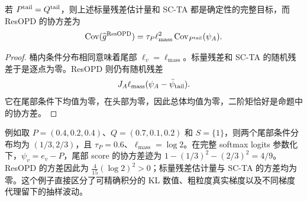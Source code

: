 \begin{proposition}
若 $P^{\mathrm{tail}}=Q^{\mathrm{tail}}$，则上述标量残差估计量和 SC-TA 都是确定性的完整目标，而 ResOPD 的协方差为
\begin{equation*}
 \operatorname{Cov}(\widehat g^{\mathrm{ResOPD}})
 =\tau_P\ell_{\mathrm{mass}}^2\operatorname{Cov}_{P^{\mathrm{tail}}}(\psi_A).
\end{equation*}
\end{proposition}

\begin{proof}
桶内条件分布相同意味着尾部 $\ell_v=\ell_{\mathrm{mass}}$。标量残差和 SC-TA 的随机残差于是逐点为零。ResOPD 则仍有随机残差
\begin{equation*}
 J_A\ell_{\mathrm{mass}}(\psi_A-\bar \psi_{\mathrm{tail}}).
\end{equation*}
它在尾部条件下均值为零，在头部为零，因此总体均值为零，二阶矩恰好是命题中的协方差。
\end{proof}

例如取 $P=(0.4,0.2,0.4)$、$Q=(0.7,0.1,0.2)$ 和 $S=\{1\}$，则两个尾部条件分布均为 $(1/3,2/3)$，且 $\tau_P=0.6$、$\ell_{\mathrm{mass}}=\log2$。在完整 softmax logits 参数化下，$\psi_v=e_v-P$，尾部 score 的协方差迹为 $1-(1/3)^2-(2/3)^2=4/9$。ResOPD 的方差因此为 $\frac4{15}(\log2)^2>0$；标量残差估计量与 SC-TA 的方差均为零。这个例子直接区分了可精确积分的 KL 数值、粗粒度真实梯度以及不同梯度代理留下的抽样波动。
